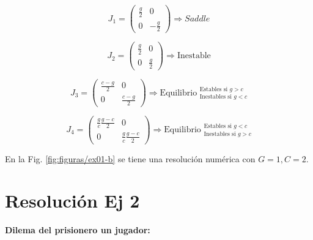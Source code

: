 \documentclass[twocolumn,aps,prl]{revtex4-1}
\begin{document}

$$ J_1 =
\begin{pmatrix}
    \frac{g}{2}
    &
    0
    \\  
    0
    &
    -\frac{g}{2}
\end{pmatrix}
\Rightarrow Saddle
$$

$$ J_2 =
\begin{pmatrix}
    \frac{g}{2}
    &
    0
    \\  
    0
    &
    \frac{g}{2}
\end{pmatrix}
\Rightarrow \text{Inestable}
$$

$$ J_3 =
\begin{pmatrix}
    \frac{c-g}{2}
    &
    0
    \\  
    0
    &
    \frac{c-g}{2}
\end{pmatrix}
\Rightarrow \text{Equilibrio }  ^{\text{Estables si } g>c}_{\text{Inestables si } g<c}
$$

$$ J_4 =
\begin{pmatrix}
    \frac{g}{c} \frac{g-c}{2}
    &
    0
    \\  
    0
    &
    \frac{g}{c} \frac{g-c}{2}
\end{pmatrix}
\Rightarrow \text{Equilibrio }  ^{\text{Estables si } g<c}_{\text{Inestables si } g>c}
$$

En la Fig. \ref{fig:figuras/ex01-b} se tiene una resolución numérica con $G=1, C=2$.

\section{Resolución Ej 2}

\textbf{Dilema del prisionero un jugador:}

\end{document}
